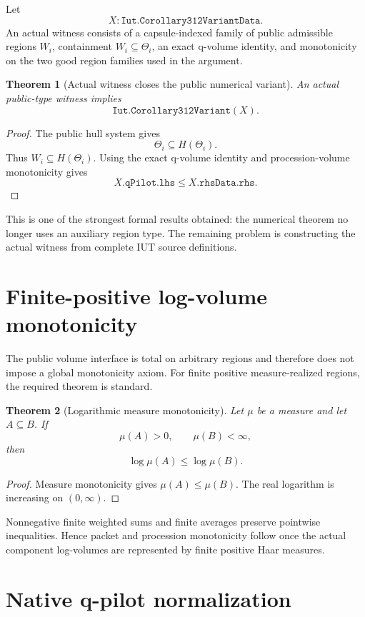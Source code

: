\documentclass[11pt]{amsart}
\newtheorem{theorem}{Theorem}[section]
\theoremstyle{definition}
\theoremstyle{remark}
\begin{document}
Let
\[
 X:\texttt{Iut.Corollary312VariantData}.
\]
An actual witness consists of a capsule-indexed family of public admissible
regions $W_i$, containment $W_i\subseteq\Theta_i$, an exact q-volume identity,
and monotonicity on the two good region families used in the argument.

\begin{theorem}[Actual witness closes the public numerical variant]
An actual public-type witness implies
\[
 \texttt{Iut.Corollary312Variant}(X).
\]
\end{theorem}

\begin{proof}
The public hull system gives
\[
 \Theta_i\subseteq H(\Theta_i).
\]
Thus $W_i\subseteq H(\Theta_i)$.  Using the exact q-volume identity and
procession-volume monotonicity gives
\[
 X.\texttt{qPilot.lhs}
 \le
 X.\texttt{rhsData.rhs}.
\]
\end{proof}

This is one of the strongest formal results obtained: the numerical theorem no
longer uses an auxiliary region type.  The remaining problem is constructing
the actual witness from complete IUT source definitions.

\section{Finite-positive log-volume monotonicity}

The public volume interface is total on arbitrary regions and therefore does
not impose a global monotonicity axiom.  For finite positive measure-realized
regions, the required theorem is standard.

\begin{theorem}[Logarithmic measure monotonicity]\label{thm:log-mono}
Let $\mu$ be a measure and let $A\subseteq B$.  If
\[
 \mu(A)>0,
 \qquad
 \mu(B)<\infty,
\]
then
\[
 \log\mu(A)\le\log\mu(B).
\]
\end{theorem}

\begin{proof}
Measure monotonicity gives $\mu(A)\le\mu(B)$.  The real logarithm is
increasing on $(0,\infty)$.
\end{proof}

Nonnegative finite weighted sums and finite averages preserve pointwise
inequalities.  Hence packet and procession monotonicity follow once the actual
component log-volumes are represented by finite positive Haar measures.

\section{Native q-pilot normalization}
\end{document}
